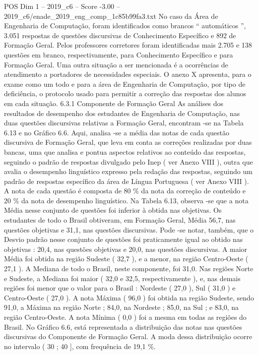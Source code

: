 \begin{textsample}{POS Dim 1 – 2019\_c6 – Score -3.00 – 2019\_c6/enade\_2019\_eng\_comp\_1c85b99fa3.txt}
No caso da Área de Engenharia de Computação, foram identificados como brancos “ automáticos ”, 3.051 respostas de questões discursivas de Conhecimento Específico e 892 de Formação Geral.
Pelos professores corretores foram identificadas mais 2.705 e 138 questões em branco, respectivamente, para Conhecimento Específico e para Formação Geral.
Uma outra situação a ser mencionada é a ocorrências de atendimento a portadores de necessidades especiais.
O anexo X apresenta, para o exame como um todo e para a área de Engenharia de Computação, por tipo de deficiência, o protocolo usado para permitir a correção das respostas dos alunos em cada situação. 6.3.1 Componente de Formação Geral As análises dos resultados de desempenho dos estudantes de Engenharia de Computação, nas duas questões discursivas relativas a Formação Geral, encontram -se na Tabela 6.13 e no Gráfico 6.6.
Aqui, analisa -se a média das notas de cada questão discursiva de Formação Geral, que leva em conta as correções realizadas por duas bancas, uma que analisa e pontua aspectos relativos ao conteúdo das respostas, seguindo o padrão de respostas divulgado pelo Inep ( ver Anexo VIII ), outra que avalia o desempenho linguístico expresso pela redação das respostas, seguindo um padrão de respostas específico da área de Língua Portuguesa ( ver Anexo VIII ).
A nota de cada questão é composta de 80 \% da nota da correção de conteúdo e 20 \% da nota de desempenho linguístico.
Na Tabela 6.13, observa -se que a nota Média nesse conjunto de questões foi inferior à obtida nas objetivas.
Os estudantes de todo o Brasil obtiveram, em Formação Geral, Média 56,7, nas questões objetivas e 31,1, nas questões discursivas.
Pode -se notar, também, que o Desvio padrão nesse conjunto de questões foi praticamente igual ao obtido nas objetivas : 20,4, nas questões objetivas e 20,0, nas questões discursivas.
A maior Média foi obtida na região Sudeste ( 32,7 ), e a menor, na região Centro-Oeste ( 27,1 ).
A Mediana de todo o Brasil, neste componente, foi 31,0.
Nas regiões Norte e Sudeste, a Mediana foi maior ( 32,0 e 32,5, respectivamente ), e, nas demais regiões foi menor que o valor para o Brasil : Nordeste ( 27,0 ), Sul ( 31,0 ) e Centro-Oeste ( 27,0 ).
A nota Máxima ( 96,0 ) foi obtida na região Sudeste, sendo 91,0, a Máxima na região Norte ; 84,0, na Nordeste ; 85,0, na Sul ; e 83,0, na região Centro-Oeste.
A nota Mínima ( 0,0 ) foi a mesma em todas as regiões do Brasil.
No Gráfico 6.6, está representada a distribuição das notas nas questões discursivas do Componente de Formação Geral.
A moda dessa distribuição ocorre no intervalo ( 30 ; 40 ], com frequência de 19,1 \%.

\end{textsample}
